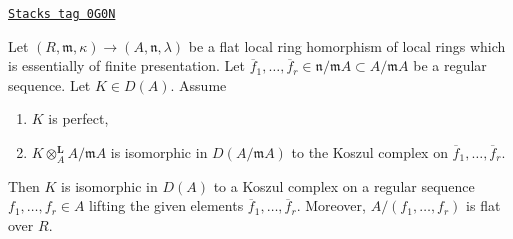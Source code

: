 \begin{lemma}
\label{equiv-lemma-deform-koszul}
\href{https://stacks.math.columbia.edu/tag/0G0N}{\texttt{Stacks tag 0G0N}}

Let $(R, \mathfrak m, \kappa) \to (A, \mathfrak n, \lambda)$
be a flat local ring homorphism of local rings
which is essentially of finite presentation.
Let $\overline{f}_1, \ldots, \overline{f}_r \in \mathfrak n/\mathfrak m A
\subset A/\mathfrak m A$ be a regular sequence. Let $K \in D(A)$. Assume
\begin{enumerate}
\item $K$ is perfect,
\item $K \otimes_A^\mathbf{L} A/\mathfrak m A$ is isomorphic in
$D(A/\mathfrak m A)$ to the
Koszul complex on $\overline{f}_1, \ldots, \overline{f}_r$.
\end{enumerate}
Then $K$ is isomorphic in $D(A)$ to a Koszul complex on a regular sequence
$f_1, \ldots, f_r \in A$ lifting the given elements
$\overline{f}_1, \ldots, \overline{f}_r$. Moreover, $A/(f_1, \ldots, f_r)$
is flat over $R$.
\end{lemma}

